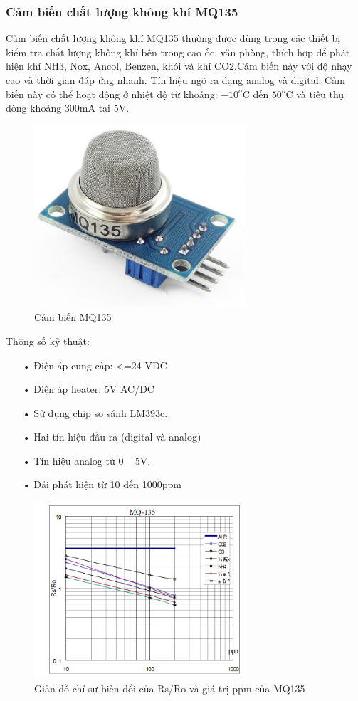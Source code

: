 \subsubsection*{Cảm biến chất lượng không khí MQ135} 
Cảm biến chất lượng không khí MQ135 thường được dùng trong các thiết bị kiểm tra chất lượng không khí bên trong cao ốc, văn phòng, thích hợp để phát hiện khí NH3, Nox, Ancol, Benzen, khói và khí CO2.Cám biến này với độ nhạy cao và thời gian đáp ứng nhanh. Tín hiệu ngõ ra dạng analog và digital. Cảm biến này có thể hoạt động ở nhiệt độ từ khoảng: $-10^{o}$C đến $50^{o}$C và tiêu thụ dòng khoảng 300mA tại 5V.
\begin{figure}[H]
	\centering    
	\includegraphics[width=0.7\textwidth]{mq135}
	\caption[Cảm biến MQ135]{Cảm biến MQ135}
	\label{fig:mq135}
\end{figure}
Thông số kỹ thuật:
\begin{itemize}
\item[•]Điện áp cung cấp: <=24 VDC
\item[•]Điện áp heater: 5V AC/DC
\item[•]Sử dụng chip so sánh LM393c.
\item[•]Hai tín hiệu đầu ra (digital và analog)
\item[•]Tín hiệu analog từ 0 ~ 5V.
\item[•]Dải phát hiện từ 10 đến 1000ppm
\end{itemize}

\begin{figure}[H]
	\centering    
	\includegraphics[width=0.7\textwidth]{mq135_mqh1}
	\caption[Giản đồ chỉ sự biến đổi của Rs/Ro và giá trị ppm của MQ135]{Giản đồ chỉ sự biến đổi của Rs/Ro và giá trị ppm của MQ135}
	\label{fig:mq135_mqh1}
\end{figure}

